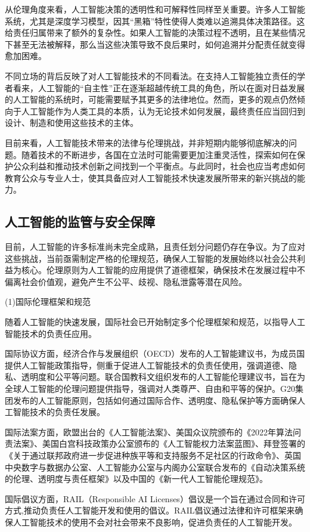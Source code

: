 从伦理角度来看，人工智能决策的透明性和可解释性同样至关重要。许多人工智能系统，尤其是深度学习模型，因其“黑箱”特性使得人类难以追溯具体决策路径。这给责任归属带来了额外的复杂性。如果人工智能的决策过程不透明，且在某些情况下甚至无法被解释，那么当这些决策导致不良后果时，如何追溯并分配责任就变得愈加困难。

不同立场的背后反映了对人工智能技术的不同看法。在支持人工智能独立责任的学者看来，人工智能的“自主性”正在逐渐超越传统工具的角色，所以在面对日益发展的人工智能的系统时，可能需要赋予其更多的法律地位。然而，更多的观点仍然倾向于人工智能作为人类工具的本质，认为无论技术如何发展，最终责任应当回归到设计、制造和使用这些技术的主体。

目前来看，人工智能技术带来的法律与伦理挑战，并非短期内能够彻底解决的问题。随着技术的不断进步，各国在立法时可能需要更加注重灵活性，探索如何在保护公众利益和推动技术创新之间找到一个平衡点。与此同时，社会也应当考虑如何教育公众与专业人士，使其具备应对人工智能技术快速发展所带来的新兴挑战的能力。

\subsection{人工智能的监管与安全保障}
目前，人工智能的许多标准尚未完全成熟，且责任划分问题仍存在争议。为了应对这些挑战，当前亟需制定严格的伦理规范，确保人工智能的发展始终以社会公共利益为核心。伦理原则为人工智能的应用提供了道德框架，确保技术在发展过程中不偏离社会价值观，避免产生不公平、歧视、隐私泄露等潜在风险。

(1)国际伦理框架和规范

随着人工智能的快速发展，国际社会已开始制定多个伦理框架和规范，以指导人工智能技术的负责任应用。

国际协议方面，经济合作与发展组织（OECD）发布的人工智能建议书，为成员国提供人工智能政策指导，侧重于促进人工智能技术的负责任使用，强调道德、隐私、透明度和公平等问题。联合国教科文组织发布的人工智能伦理建议书，旨在为全球人工智能的伦理问题提供指导，强调对人类尊严、自由和平等的保护。G20集团发布的人工智能原则，包括如何通过国际合作、透明度、隐私保护等方面确保人工智能技术的负责任发展。

国际法案方面，欧盟出台的《人工智能法案》、美国众议院颁布的《2022年算法问责法案》、美国白宫科技政策办公室颁布的《人工智能权力法案蓝图》、拜登签署的《关于通过联邦政府进一步促进种族平等和支持服务不足社区的行政命令》、英国中央数字与数据办公室、人工智能办公室与内阁办公室联合发布的《自动决策系统的伦理、透明度与责任框架》以及中国的《新一代人工智能伦理规范》。

国际倡议方面，RAIL（Responsible AI Licenses）倡议是一个旨在通过合同和许可方式,推动负责任人工智能开发和使用的倡议。RAIL倡议通过法律和许可框架来确保人工智能技术的使用不会对社会带来不良影响，促进负责任的人工智能开发。

